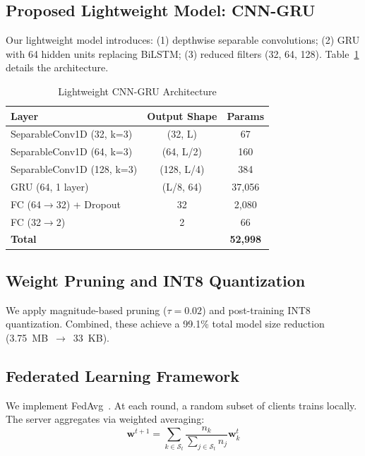 \documentclass[12pt,a4paper]{article}
\begin{document}
\subsection{Proposed Lightweight Model: CNN-GRU}

Our lightweight model introduces: (1) depthwise separable convolutions; (2) GRU with 64 hidden units replacing BiLSTM; (3) reduced filters (32, 64, 128). Table~\ref{tab:lightweight} details the architecture.

\begin{table}[hbt]
\centering
\caption{Lightweight CNN-GRU Architecture}
\label{tab:lightweight}
\begin{tabular}{lcc}
\toprule
Layer & Output Shape & Params \\
\midrule
SeparableConv1D (32, k=3) & (32, L) & 67 \\
SeparableConv1D (64, k=3) & (64, L/2) & 160 \\
SeparableConv1D (128, k=3) & (128, L/4) & 384 \\
GRU (64, 1 layer) & (L/8, 64) & 37,056 \\
FC (64$\rightarrow$32) + Dropout & 32 & 2,080 \\
FC (32$\rightarrow$2) & 2 & 66 \\
\midrule
\textbf{Total} & & \textbf{52,998} \\
\bottomrule
\end{tabular}
\end{table}

\subsection{Weight Pruning and INT8 Quantization}

We apply magnitude-based pruning ($\tau=0.02$) and post-training INT8 quantization. Combined, these achieve a 99.1\% total model size reduction (3.75~MB~$\rightarrow$~33~KB).

\subsection{Federated Learning Framework}

We implement FedAvg~\cite{mcmahan2017communication}. At each round, a random subset of clients trains locally. The server aggregates via weighted averaging:
\begin{equation}
\mathbf{w}^{t+1} = \sum_{k \in \mathcal{S}_t} \frac{n_k}{\sum_{j \in \mathcal{S}_t} n_j} \mathbf{w}_k^t
\end{equation}
\end{document}

